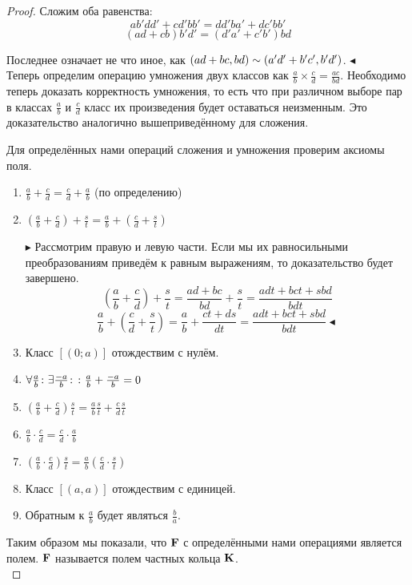 \begin{proof}
Сложим оба равенства:
$$ ab'dd'+cd'bb'= dd'ba'+dc'bb'$$
$$(ad+cb)b'd'   =(d'a'+c'b')bd $$

Последнее означает не что иное, как $(ad+bc,bd)\bw\sim(a'd'+b'c',b'd')$. $\blacktriangleleft$\\

Теперь определим операцию умножения двух классов как $\frac{a}{b}\times\frac{c}{d}=\frac{ac}{bd}$. Необходимо теперь доказать корректность умножения, то есть что при различном выборе пар в классах $\frac{a}{b}$ и $\frac{c}{d}$ класс их произведения будет оставаться неизменным. Это доказательство аналогично вышеприведённому для сложения.

Для определённых нами операций сложения и умножения проверим аксиомы поля.

\begin{enumerate}
 \item $\frac{a}{b}+\frac{c}{d}=\frac{c}{d}+\frac{a}{b}$ (по определению)
 \item $\left(\frac{a}{b}+\frac{c}{d}\right)+\frac{s}{t} = \frac{a}{b}+\left(\frac{c}{d}+\frac{s}{t}\right)$
 
   $\blacktriangleright$ Рассмотрим правую и левую части. Если мы их равносильными преобразованиям приведём к равным выражениям, то доказательство будет завершено.
   $$\left(\frac{a}{b}+\frac{c}{d}\right)+\frac{s}{t}=\frac{ad+bc}{bd}+\frac{s}{t}=\frac{adt+bct+sbd}{bdt}$$
   $$\frac{a}{b}+\left(\frac{c}{d}+\frac{s}{t}\right)=\frac{a}{b}+\frac{ct+ds}{dt}=\frac{adt+bct+sbd}{bdt}\blacktriangleleft$$
  
 \item Класс $[(0;a)]$ отождествим с нулём.
 \item $\forall\frac{a}{b}\colon\exists\frac{-a}{b}\colon\colon\frac{a}{b}+\frac{-a}{b}=0$
 \item $\left( \frac{a}{b}+\frac{c}{d} \right)\frac{s}{t}= \frac{a}{b}\frac{s}{t}+\frac{c}{d}\frac{s}{t}$
 \item $\frac{a}{b}\cdot\frac{c}{d}=\frac{c}{d}\cdot\frac{a}{b}$
 \item $\left(\frac{a}{b}\cdot\frac{c}{d}\right)\frac{s}{t}=\frac{a}{b}\left(\frac{c}{d}\cdot\frac{s}{t}\right)$
 \item Класс $[(a,a)]$ отождествим с единицей.
 \item Обратным к $\frac{a}{b}$ будет являться $\frac{b}{a}$.
\end{enumerate}

Таким образом мы показали, что $\mathbf{F}$ с определёнными нами операциями является полем. $\mathbf{F}$ называется полем частных кольца $\mathbf{K}$.\\


\end{proof}
